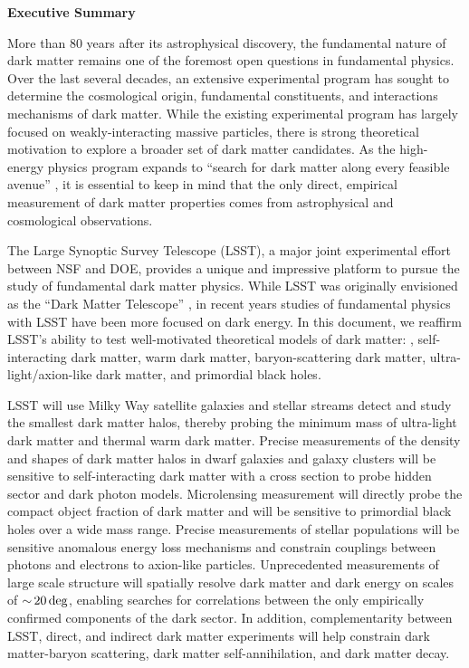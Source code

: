 \begin{center}
  {\Large \bf Executive Summary}
\end{center}

More than 80 years after its astrophysical discovery, the fundamental nature of dark matter remains one of the foremost open questions in fundamental physics.
Over the last several decades, an extensive experimental program has sought to determine the cosmological origin, fundamental constituents, and interactions mechanisms of dark matter. 
While the existing experimental program has largely focused on weakly-interacting massive particles, there is strong theoretical motivation to explore a broader set of dark matter candidates.
As the high-energy physics program expands to ``search for dark matter along every feasible avenue'' \citep{P5:2014}, it is essential to keep in mind that the only direct, empirical measurement of dark matter properties comes from astrophysical and cosmological observations.

The Large Synoptic Survey Telescope (LSST), a major joint experimental effort between NSF and DOE, provides a unique and impressive platform to pursue the study of fundamental dark matter physics.
While LSST was originally envisioned as the ``Dark Matter Telescope'' \citep{Tyson:2001}, in recent years studies of fundamental physics with LSST have been more focused on dark energy.
In this document, we reaffirm LSST's ability to test well-motivated theoretical models of dark matter: \ie, self-interacting dark matter, warm dark matter, baryon-scattering dark matter, ultra-light/axion-like dark matter, and primordial black holes. 

LSST will use Milky Way satellite galaxies and stellar streams detect and study the smallest dark matter halos, thereby probing the minimum mass of ultra-light dark matter and thermal warm dark matter.
Precise measurements of the density and shapes of dark matter halos in dwarf galaxies and galaxy clusters will be sensitive to self-interacting dark matter with a cross section to probe hidden sector and dark photon models.
Microlensing measurement will directly probe the compact object fraction of dark matter and will be sensitive to primordial black holes over a wide mass range.
Precise measurements of stellar populations will be sensitive anomalous energy loss mechanisms and constrain couplings between photons and electrons to axion-like particles.
Unprecedented measurements of large scale structure will spatially resolve dark matter and dark energy on scales of $ {\sim}\, 20\mathrm{\,deg}$, enabling searches for correlations between the only empirically confirmed components of the dark sector.
In addition, complementarity between LSST, direct, and indirect dark matter experiments will help constrain dark matter-baryon scattering, dark matter self-annihilation, and dark matter decay.

